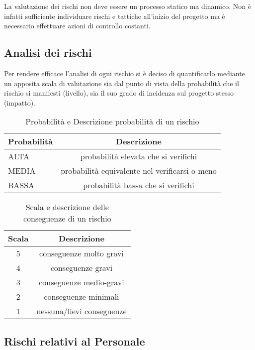 La valutazione dei rischi non deve essere un processo statico ma dinamico. Non è infatti sufficiente individuare rischi e tattiche all'inizio del progetto ma è necessario effettuare azioni di controllo costanti. 

\subsection{Analisi dei rischi}


Per rendere efficace l'analisi di ogni rischio si è deciso di quantificarlo mediante un apposita scala di valutazione sia dal punto di vista della probabilità che il rischio si manifesti (livello), sia il suo grado di incidenza sul progetto stesso (impatto).

\begin{table}[h!]
\centering
\begin{tabular}{|l|c|}
\hline
Probabilità& Descrizione\\
\hline
ALTA & probabilità elevata che si verifichi\\
MEDIA & probabilità equivalente nel verificarsi o meno\\
BASSA & probabilità bassa che si verifichi\\
\hline
\end{tabular}
\caption{Probabilità e Descrizione probabilità di un rischio}\label{tab:livellorischi}
\end{table}
\begin{table}[h!]
\centering
\begin{tabular}{|c|c|}
\hline
Scala& Descrizione  \\
\hline
5 & conseguenze molto gravi\\
4 & conseguenze gravi\\
3 & conseguenze medio-gravi\\
2 & conseguenze minimali\\
1 & nessuna/lievi conseguenze\\
\hline
\end{tabular}
\caption{Scala e descrizione delle conseguenze di un rischio}\label{tab:impattorischi}
\end{table}


\subsection{Rischi relativi al Personale}

